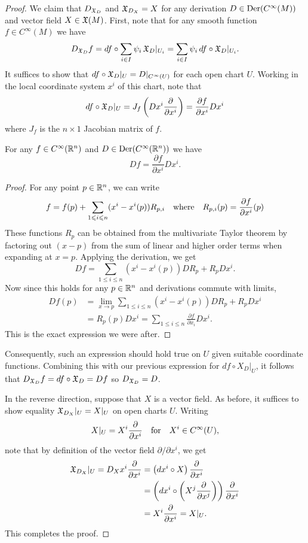 \documentclass{lkx_paper}
\begin{document}
\begin{proof}
	We claim that $D_{\mathfrak{X}_D}$ and $\mathfrak{X}_{D_X} = X$ for any derivation $D\in \mathrm{Der}(C^\infty(M))$ and vector field $X\in \mathfrak{X}(M)$. First, note that for any smooth function $f\in C^\infty(M)$ we have
	\[
		D_{\mathfrak{X}_D} f = df\circ \sum_{i\in I} \psi_i\,\mathfrak{X}_{D}|_{U_i} = \sum_{i\in I} \psi_i\,df\circ \mathfrak{X}_{D}|_{U_i}.
	\]
	It suffices to show that $df\circ \mathfrak{X}_{D}|_U = D|_{C^\infty(U)}$ for each open chart $U$. Working in the local coordinate system $x^i$ of this chart, note that
	\[
		df\circ \mathfrak{X}_{D}|_U = J_f  \left(Dx^i \frac{\partial}{\partial x^i}\right) = \frac{\partial f}{\partial x^i} Dx^i
	\]
	where $J_f$ is the $n\times 1$ Jacobian matrix of $f$.
	\begin{changemargins}
		\begin{lemma*}
			For any $f\in C^\infty(\mathbb{R}^n)$ and $D\in \mathrm{Der}(C^\infty(\mathbb{R}^n))$ we have
			\[
				Df = \frac{\partial f}{\partial x^i}  D x^i.
			\]
		\end{lemma*}
		\begin{proof}
			For any point $p\in \mathbb{R}^n$, we can write
			\[
				f = f(p) + \sum_{1\leqslant i \leqslant n}(x^i-x^i(p)) R_{p,i}\quad\textrm{where}\quad R_{p,i}(p) = \frac{\partial f}{\partial x^i}(p)
			\]
			These functions $R_{p}$ can be obtained from the multivariate Taylor theorem by factoring out $(x-p)$ from the sum of linear and higher order terms when expanding at $x=p$.
			Applying the derivation, we get
			\[
				D f = \sum_{1\leq i \leq n}(x^i-x^i(p))  D R_p + R_p Dx^i.
			\]
			Now since this holds for any $p\in \mathbb{R}^n$ and derivations commute with limits,
			\[
				\begin{aligned}
					D f(p) & = \lim_{x\to p} \sum_{1\leq i \leq n} (x^i-x^i(p)) D R_p + R_p  Dx^i         \\
					       & = R_p(p)  Dx^i = \sum_{1\leq i \leq n}\frac{\partial f}{\partial x_i} D x^i.
				\end{aligned}
			\]
			This is the exact expression we were after.
		\end{proof}
	\end{changemargins}

	Consequently, such an expression should hold true on $U$ given suitable coordinate functions. Combining this with our previous expression for $df\circ X_{D}|_U$, it follows that $D_{\mathfrak{X}_D} f = df\circ \mathfrak{X}_{D} = Df$ so $D_{\mathfrak{X}_D} = D$.

	In the reverse direction, suppose that $X$ is a vector field. As before, it suffices to show equality $\mathfrak{X}_{D_X}|_U = X|_U$ on open charts $U$. Writing \[ X|_U = X^i \frac{\partial}{\partial x^i} \quad\textrm{for}\quad X^i\in C^\infty(U), \]
	note that by definition of the vector field $\partial/\partial x^i$, we get
	\[
		\begin{aligned}
			\mathfrak{X}_{D_X}|_U  = D_X x^i  \frac{\partial}{\partial x^i}
			 & = \left(dx^i\circ X\right) \frac{\partial}{\partial x^i}                                               \\
			 & = \left(dx^i\circ \left(X^j  \frac{\partial}{\partial x^j}\right)\right) \frac{\partial}{\partial x^i} \\
			 & = X^i  \frac{\partial}{\partial x^i} = X|_U.
		\end{aligned}
	\]
	This completes the proof.
\end{proof}
\end{document}
